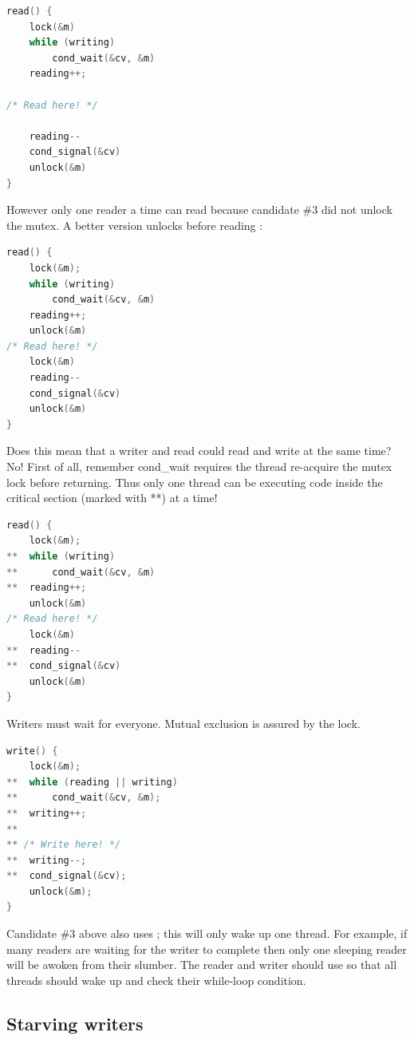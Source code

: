 \begin{lstlisting}[language=C]
read() {
    lock(&m)
    while (writing)
        cond_wait(&cv, &m)
    reading++;

/* Read here! */

    reading--
    cond_signal(&cv)
    unlock(&m)
}
\end{lstlisting}

However only one reader a time can read because candidate \#3 did not unlock the mutex. A better version unlocks before reading :

\begin{lstlisting}[language=C]
read() {
    lock(&m);
    while (writing)
        cond_wait(&cv, &m)
    reading++;
    unlock(&m)
/* Read here! */
    lock(&m)
    reading--
    cond_signal(&cv)
    unlock(&m)
}
\end{lstlisting}

Does this mean that a writer and read could read and write at the same time? No! First of all, remember cond\_wait requires the thread re-acquire the mutex lock before returning. Thus only one thread can be executing code inside the critical section (marked with **) at a time!

\begin{lstlisting}[language=C]
read() {
    lock(&m);
**  while (writing)
**      cond_wait(&cv, &m)
**  reading++;
    unlock(&m)
/* Read here! */
    lock(&m)
**  reading--
**  cond_signal(&cv)
    unlock(&m)
}
\end{lstlisting}

Writers must wait for everyone. Mutual exclusion is assured by the lock.

\begin{lstlisting}[language=C]
write() {
    lock(&m);
**  while (reading || writing)
**      cond_wait(&cv, &m);
**  writing++;
**
** /* Write here! */
**  writing--;
**  cond_signal(&cv);
    unlock(&m);
}
\end{lstlisting}

Candidate \#3 above also uses  ; this will only wake up one thread. For example, if many readers are waiting for the writer to complete then only one sleeping reader will be awoken from their slumber. The reader and writer should use  so that all threads should wake up and check their while-loop condition.

\subsection{Starving writers}\label{starving-writers}

